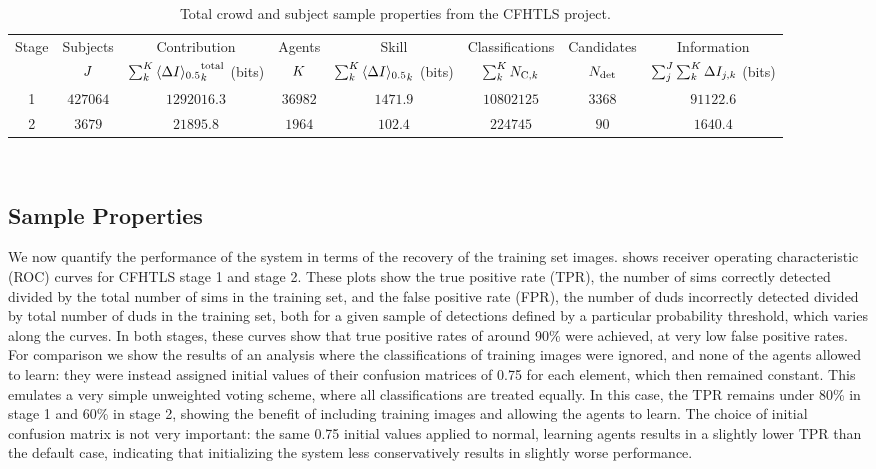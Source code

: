 \documentclass[useAMS,usenatbib,a4paper]{mn2e}
\begin{document}
\begin{table}
\begin{center}
\caption{Total crowd and subject sample properties from the CFHTLS project.}
\label{tab:crowd:contributions}
\begin{tabular}{cccccccc}
  \hline
  \hline {Stage} & Subjects & Contribution                          & Agents & Skill      & Classifications          & Candidates & Information \\
                 & $J$    & $\sum_k^{K} {\langle \Delta I \rangle_{0.5}}^{\rm total}_k$ (bits) & $K$  & $\sum_k^{K} {\langle \Delta I \rangle_{0.5}}_k$ (bits) & $\sum_k^{K} N_{{\rm C},k}$ & $N_{\rm det}$  & $\sum_j^{J}\sum_k^{K} \Delta I_{j,k}$ (bits) \\
  \hline 
            1    & $427064$ & $1292016.3$ & $36982$ & $1471.9$ & $10802125$ & $3368$ & $91122.6$ \\
            2    & $3679$   &   $21895.8$ &  $1964$ &  $102.4$ &   $224745$ &   $90$ &  $1640.4$ \\
  \hline \hline
\end{tabular}
\medskip\\
\end{center}
\end{table}


\subsection{Sample Properties}
\label{sec:results:sample}

We now quantify the performance of the \sw system in terms of the recovery of
the training set images.  shows receiver
operating characteristic (ROC) curves for CFHTLS stage 1 and stage 2. These
plots show the true positive rate (TPR), the number of sims correctly detected
divided by the total number of sims in the training set, and the false
positive rate (FPR), the number of duds incorrectly detected  divided by total
number of duds in the training set, both for a given sample of detections defined by
a particular probability threshold, which varies along the curves.  In both
stages, these curves show that true positive rates of  around 90\% were
achieved, at very low false positive rates. For comparison we show the results
of an analysis where the classifications of  training images were ignored, and
none of the agents allowed to learn: they were instead assigned initial values
of their confusion matrices of 0.75 for each element, which then remained
constant. This emulates a very simple unweighted voting scheme, where all
classifications are treated equally. In this case, the TPR remains under 80\%
in stage 1 and 60\% in stage 2, showing the benefit of including training
images and allowing the agents to learn. The choice of initial confusion
matrix is not very important: the same 0.75 initial values applied to normal,
learning agents results in a slightly lower TPR than the default case,
indicating that initializing the system less conservatively results in
slightly worse performance.
\end{document}
